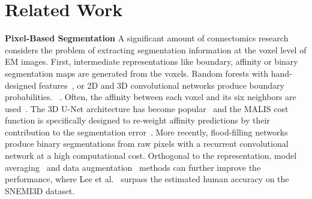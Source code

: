 
\section{Related Work}
\noindent\textbf{Pixel-Based Segmentation}
A significant amount of connectomics research considers the problem of extracting segmentation information at the voxel level of EM images.
First, intermediate representations like boundary, affinity or binary segmentation maps are generated from the voxels.
Random forests with hand-designed features~\cite{kaynig2015large}, or 2D and 3D convolutional networks produce boundary probabilities. ~\cite{seymour2016rhoananet,ronneberger2015u,bogovic2013learned,ciresan2012deep,jain2010boundary,amelio_segmentation}.
Often, the affinity between each voxel and its six neighbors are used~\cite{lee2015recursive,parag2017anisotropic,lee2017superhuman,cciccek20163d,turaga2010convolutional}. 
The 3D U-Net architecture has become popular~\cite{cciccek20163d} and the MALIS cost function is specifically designed to re-weight affinity predictions by their contribution to the segmentation error~\cite{briggman2009maximin}.
More recently, flood-filling networks~\cite{januszewski2016flood} produce binary segmentations from raw pixels with a recurrent convolutional network at a high computational cost.
Orthogonal to the representation, model averaging~\cite{zeng2017deepem3d} and data augmentation~\cite{lee2017superhuman} methods can further improve the performance, where Lee et al.~\cite{lee2017superhuman} surpass the estimated human accuracy on the SNEMI3D dataset.

